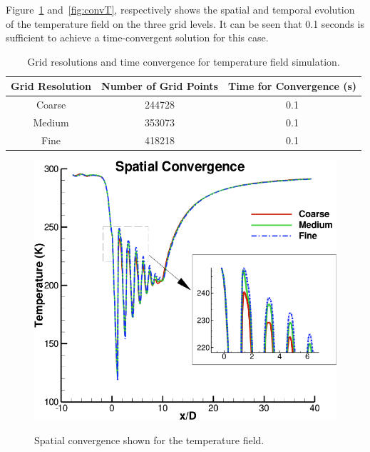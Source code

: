 \documentclass[12pt]{article}
\begin{document}
Figure~\ref{fig:convS} and~\ref{fig:convT}, respectively shows the spatial and temporal evolution of the temperature field on the three grid levels. It can be seen that 0.1 seconds is sufficient to achieve a time-convergent solution for this case.

\begin{table}[H]
\centering
\caption{Grid resolutions and time convergence for temperature field simulation.}
\label{tab:convergence_study}
\begin{tabular}{ccc}
\hline
\textbf{Grid Resolution} & \textbf{Number of Grid Points} & \textbf{Time for Convergence (s)} \\ \hline
Coarse                   & 244728                      & 0.1                             \\ \hline
Medium                   & 353073                      & 0.1                             \\ \hline
Fine                     & 418218                      & 0.1                             \\ \hline
\end{tabular}
\end{table}

\begin{figure}[H]
    \centering
    \includegraphics[width=0.7\linewidth]{figs/f3.png}\\
    \caption{Spatial convergence shown for the temperature field.}
    \label{fig:convS}
\end{figure}
\end{document}
